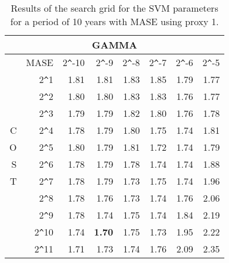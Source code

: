 \begin{table}[h!]
\centering
\begin{adjustbox}{width=0.9\textwidth}
\begin{tabular}{|r|r|rrrrrr|}
\hline
\multicolumn{8}{|c|}{GAMMA} \tabularnewline
\hline
 &MASE& 2\verb|^|-10 & 2\verb|^|-9 & 2\verb|^|-8 & 2\verb|^|-7 & 2\verb|^|-6 & 2\verb|^|-5 \\ 
  \hline
  &2\verb|^|1 & 1.81 & 1.81 & 1.83 & 1.85 & 1.79 & 1.77 \\ 
  &2\verb|^|2 & 1.80 & 1.80 & 1.83 & 1.83 & 1.76 & 1.77 \\ 
  &2\verb|^|3 & 1.79 & 1.79 & 1.82 & 1.80 & 1.76 & 1.78 \\ 
  C&2\verb|^|4 & 1.78 & 1.79 & 1.80 & 1.75 & 1.74 & 1.81 \\ 
  O&2\verb|^|5 & 1.80 & 1.79 & 1.81 & 1.72 & 1.74 & 1.79 \\ 
  S&2\verb|^|6 & 1.78 & 1.79 & 1.78 & 1.74 & 1.74 & 1.88 \\ 
  T&2\verb|^|7 & 1.78 & 1.79 & 1.73 & 1.75 & 1.74 & 1.96 \\ 
  &2\verb|^|8 & 1.78 & 1.76 & 1.73 & 1.74 & 1.76 & 2.06 \\ 
  &2\verb|^|9 & 1.78 & 1.74 & 1.75 & 1.74 & 1.84 & 2.19 \\ 
  &2\verb|^|10 & 1.74 & \textbf{1.70} & 1.75 & 1.73 & 1.95 & 2.22 \\ 
  &2\verb|^|11 & 1.71 & 1.73 & 1.74 & 1.76 & 2.09 & 2.35 \\ 
   \hline
\end{tabular}
\end{adjustbox}
\caption{Results of the search grid for the SVM parameters for a period of 10 years with MASE using proxy 1.}
\end{table}